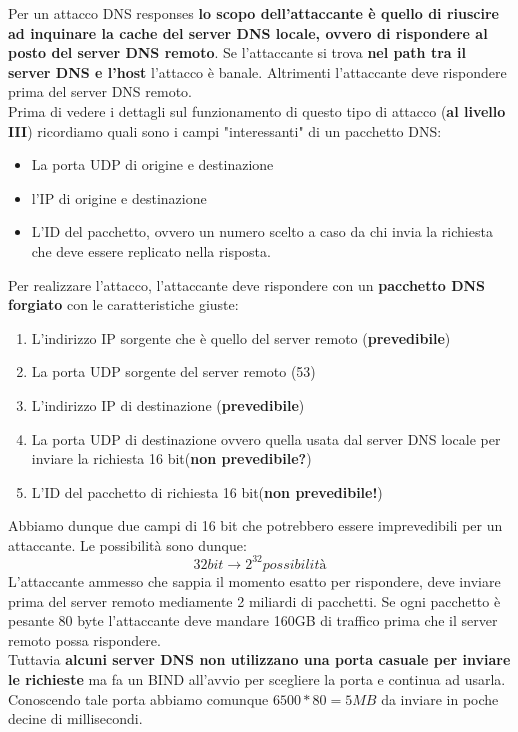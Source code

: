 \documentclass[12pt]{article}
\begin{document}
				Per un attacco DNS responses \textbf{lo scopo dell'attaccante è quello di riuscire ad inquinare la cache del server DNS locale, ovvero di rispondere al posto del server DNS remoto}. Se l'attaccante si trova \textbf{nel path tra il server DNS e l'host } l'attacco è banale. Altrimenti l'attaccante deve rispondere prima del server DNS remoto. \\
				Prima di vedere i dettagli sul funzionamento di questo tipo di attacco (\textbf{al livello III}) ricordiamo quali sono i campi "interessanti" di un pacchetto DNS:
				\begin{itemize}
					\item La porta UDP di origine e destinazione
					\item l'IP  di origine e destinazione
					\item L'ID del pacchetto, ovvero un numero scelto a caso da chi invia la richiesta che deve essere replicato nella risposta.	
				\end{itemize}
				Per realizzare l'attacco, l'attaccante deve rispondere con un \textbf{pacchetto DNS forgiato} con le caratteristiche giuste:
				\begin{enumerate}
					\item L'indirizzo IP sorgente che è quello del server remoto (\textbf{prevedibile})
					\item La porta UDP sorgente del server remoto (53)
					\item L'indirizzo IP di destinazione (\textbf{prevedibile})
					\item La porta UDP di destinazione ovvero quella usata dal server DNS locale per inviare la richiesta 16 bit(\textbf{non prevedibile?})
					\item L'ID del pacchetto di richiesta 16 bit(\textbf{non prevedibile!})
				\end{enumerate}
				Abbiamo dunque due campi di 16 bit che potrebbero essere imprevedibili per un attaccante. Le possibilità sono dunque:
				$$32bit \rightarrow 2^{32} possibilità$$
				L'attaccante ammesso che sappia il momento esatto per rispondere, deve inviare prima del server remoto mediamente 2 miliardi di pacchetti. Se ogni pacchetto è pesante 80 byte l'attaccante deve mandare 160GB di traffico prima che il server remoto possa rispondere.	\\
				Tuttavia \textbf{alcuni server DNS non utilizzano una porta casuale per inviare le richieste} ma fa un BIND all'avvio per scegliere la porta e continua ad usarla. Conoscendo tale porta abbiamo comunque $6500*80 = 5MB$ da inviare in poche decine di millisecondi.\\
\end{document}
